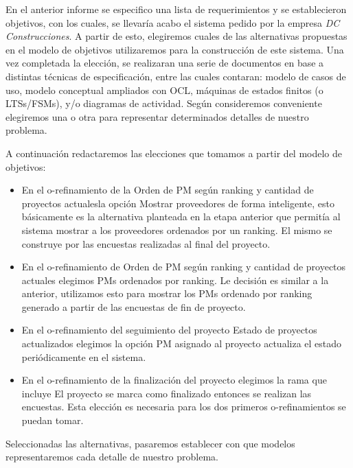 En el anterior informe se especifico una lista de requerimientos y se establecieron objetivos, con los cuales,
se llevaría acabo el sistema pedido por la empresa \textit{DC Construcciones}. A partir de esto,
elegiremos cuales de las alternativas propuestas en el modelo de objetivos utilizaremos para la
construcción de este sistema. Una vez completada la elección, se realizaran una serie de documentos
en base a distintas técnicas de especificación, entre las cuales contaran: modelo de casos de uso,
modelo conceptual ampliados con OCL, máquinas de estados finitos (o LTSs/FSMs), y/o diagramas
de actividad. Según consideremos conveniente elegiremos una o otra para representar determinados
detalles de nuestro problema.

A continuación redactaremos las elecciones que tomamos a partir del modelo de objetivos:

\begin{itemize}
\item En el o-refinamiento de la Orden de PM según ranking y cantidad de proyectos actualesla opción Mostrar proveedores de forma inteligente, esto básicamente es la alternativa planteada
en la etapa anterior que permitía al sistema mostrar a los proveedores ordenados por un ranking. El mismo se construye por las encuestas realizadas al final
del proyecto.
\item En el o-refinamiento de Orden de PM según ranking y cantidad de proyectos actuales elegimos PMs ordenados por ranking. Le decisión es similar a la anterior,
utilizamos esto para mostrar los PMs ordenado por ranking generado a partir de las encuestas de fin de proyecto.
\item En el o-refinamiento del seguimiento del proyecto Estado de proyectos actualizados elegimos la opción PM asignado al proyecto
actualiza el estado periódicamente en el sistema.
\item En el o-refinamiento de la finalización del proyecto elegimos la rama que incluye El proyecto se marca como finalizado entonces se realizan
las encuestas. Esta elección es necesaria para los dos primeros o-refinamientos se puedan tomar.
\end{itemize}

Seleccionadas las alternativas, pasaremos establecer con que modelos representaremos cada detalle de nuestro problema.

